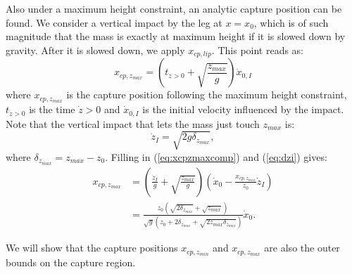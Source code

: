 \documentclass[letterpaper, 10 pt, conference]{ieeeconf}  %
\newcommand{\zmin}{z_{min}}
\newcommand{\zmax}{z_{max}}
\begin{document}
Also under a maximum height constraint, an analytic capture position can be found. We consider a vertical impact by the leg at $x=x_0$, which is of such magnitude that the mass is exactly at maximum height if it is slowed down by gravity. After it is slowed down, we apply $x_{cp,lip}$. This point reads as:
\begin{equation}
	x_{cp,\zmax} =(t_{\dot{z}>0} + \sqrt{\frac{\zmax}{g}})\dot{x}_{0,I}
	\label{eq:xcpzmaxcomp}
\end{equation} 
where $x_{cp,\zmax}$ is the capture position following the maximum height constraint, $t_{\dot{z}>0}$ is the time $\dot{z}>0$ and $\dot{x}_{0,I}$ is the initial velocity influenced by the impact. Note that the vertical impact that lets the mass just touch $\zmax$ is:
\begin{equation}
	\dot{z}_{I} = \sqrt{2g\delta_{\zmax}},
	\label{eq:dzi}
\end{equation}
where $\delta_{\zmax}=\zmax-z_0$. Filling in (\ref{eq:xcpzmaxcomp}) and (\ref{eq:dzi}) gives:
\begin{align}
	x_{cp,\zmax} &= (\frac{\dot{z}_I}{g}+\sqrt{\frac{\zmax}{g}})(\dot{x}_0-\frac{x_{cp,\zmax}}{z_0}\dot{z}_I)\\
	&=\frac{z_0(\sqrt{2\delta_{\zmax}}+\sqrt{\zmax})}{\sqrt{g}(z_0 + 2\delta_{\zmax} + \sqrt{2\zmax \delta_{\zmax}})}\dot{x}_0.
\end{align}

We will show that the capture positions $x_{cp,\zmin}$ and $x_{cp,\zmax}$ are also the outer bounds on the capture region.
\end{document}

